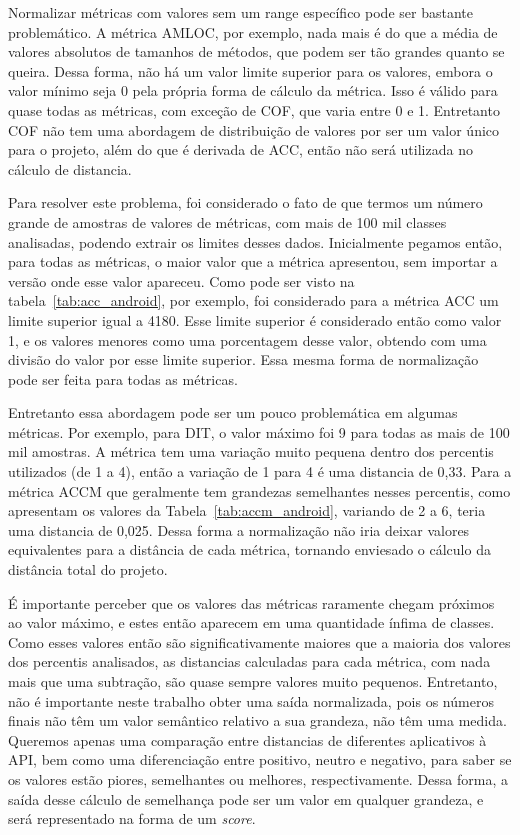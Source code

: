 Normalizar métricas com valores sem um range específico pode ser bastante problemático. A métrica AMLOC, por exemplo, nada mais é do que a média de valores absolutos de tamanhos de métodos, que podem ser tão grandes quanto se queira. Dessa forma, não há um valor limite superior para os valores, embora o valor mínimo seja 0 pela própria forma de cálculo da métrica. Isso é válido para quase todas as métricas, com exceção de COF, que varia entre 0 e 1. Entretanto COF não tem uma abordagem de distribuição de valores por ser um valor único para o projeto, além do que é derivada de ACC, então não será utilizada no cálculo de distancia.

Para resolver este problema, foi considerado o fato de que termos um número grande de amostras de valores de métricas, com mais de 100 mil classes analisadas, podendo extrair os limites desses dados. Inicialmente pegamos então, para todas as métricas, o maior valor que a métrica apresentou, sem importar a versão onde esse valor apareceu. Como pode ser visto na tabela~\ref{tab:acc_android}, por exemplo, foi considerado para a métrica ACC um limite superior igual a 4180. Esse limite superior é considerado então como valor 1, e os valores menores como uma porcentagem desse valor, obtendo com uma divisão do valor por esse limite superior. Essa mesma forma de normalização pode ser feita para todas as métricas. 

Entretanto essa abordagem pode ser um pouco problemática em algumas métricas. Por exemplo, para DIT, o valor máximo foi 9 para todas as mais de 100 mil amostras. A métrica tem uma variação muito pequena dentro dos percentis utilizados (de 1 a 4), então a variação de 1 para 4 é uma distancia de 0,33. Para a métrica ACCM que geralmente tem grandezas semelhantes nesses percentis, como apresentam os valores da Tabela~\ref{tab:accm_android}, variando de 2 a 6, teria uma distancia de 0,025. Dessa forma a normalização não iria deixar valores equivalentes para a distância de cada métrica, tornando enviesado o cálculo da distância total do projeto.

É importante perceber que os valores das métricas raramente chegam próximos ao valor máximo, e estes então aparecem em uma quantidade ínfima de classes. Como esses valores então são significativamente maiores que a maioria dos valores dos percentis analisados, as distancias calculadas para cada métrica, com nada mais que uma subtração, são quase sempre valores muito pequenos. Entretanto, não é importante neste trabalho obter uma saída normalizada, pois os números finais não têm um valor semântico relativo a sua grandeza, não têm uma medida. Queremos apenas uma comparação entre distancias de diferentes aplicativos à API, bem como uma diferenciação entre positivo, neutro e negativo, para saber se os valores estão piores, semelhantes ou melhores, respectivamente. Dessa forma, a saída desse cálculo de semelhança pode ser um valor em qualquer grandeza, e será representado na forma de um \textit{score}.

